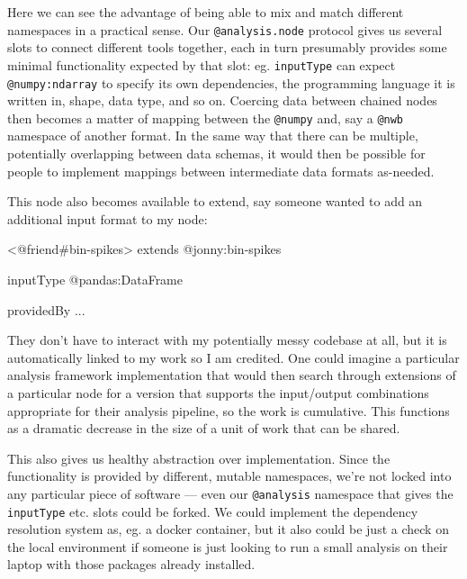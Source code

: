 \documentclass[10pt]{article}
\newenvironment{Shaded}{}{}
\newcommand{\NormalTok}[1]{#1}
\begin{document}
\begin{multicols}{2}
Here we can see the advantage of being able to mix and match different
namespaces in a practical sense. Our \texttt{@analysis.node} protocol
gives us several slots to connect different tools together, each in turn
presumably provides some minimal functionality expected by that slot:
eg. \texttt{inputType} can expect \texttt{@numpy:ndarray} to specify its
own dependencies, the programming language it is written in, shape, data
type, and so on. Coercing data between chained nodes then becomes a
matter of mapping between the \texttt{@numpy} and, say a \texttt{@nwb}
namespace of another format. In the same way that there can be multiple,
potentially overlapping between data schemas, it would then be possible
for people to implement mappings between intermediate data formats
as-needed.

This node also becomes available to extend, say someone wanted to add an
additional input format to my node:

\begin{Shaded}
\begin{Highlighting}[]
\NormalTok{\textless{}@friend\#bin{-}spikes\textgreater{}}
\NormalTok{  extends @jonny:bin{-}spikes}

\NormalTok{  inputType}
\NormalTok{    @pandas:DataFrame}

\NormalTok{  providedBy}
\NormalTok{    ...}
\end{Highlighting}
\end{Shaded}

They don't have to interact with my potentially messy codebase at all,
but it is automatically linked to my work so I am credited. One could
imagine a particular analysis framework implementation that would then
search through extensions of a particular node for a version that
supports the input/output combinations appropriate for their analysis
pipeline, so the work is cumulative. This functions as a dramatic
decrease in the size of a unit of work that can be shared.

This also gives us healthy abstraction over implementation. Since the
functionality is provided by different, mutable namespaces, we're not
locked into any particular piece of software --- even our
\texttt{@analysis} namespace that gives the \texttt{inputType} etc.
slots could be forked. We could implement the dependency resolution
system as, eg. a docker container, but it also could be just a check on
the local environment if someone is just looking to run a small analysis
on their laptop with those packages already installed.


\end{multicols}
\end{document}
